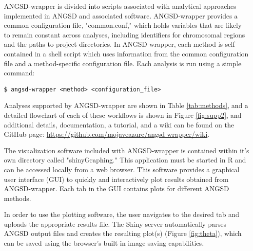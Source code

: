\documentclass[10pt,a4paper]{article}
\begin{document}
ANGSD-wrapper is divided into scripts associated with analytical approaches implemented in ANGSD and associated software. 
ANGSD-wrapper provides a common configuration file, "common.conf," which  holds variables that are likely to remain constant across analyses, including identifiers for chromosomal regions and the paths to project directories.
In ANGSD-wrapper, each method is self-contained in a shell script which uses information from the common configuration file and a method-specific configuration file. 
Each analysis is run using a simple command:

\begin{lstlisting}
$ angsd-wrapper <method> <configuration_file>
\end{lstlisting}

Analyses supported by ANGSD-wrapper are shown in Table \ref{tab:methods}, and a detailed flowchart of each of these workflows is shown in Figure \ref{fig:supp2}, and additional details, documentation, a tutorial, and a wiki can be found on the GitHub page: \url{https://github.com/mojaveazure/angsd-wrapper/wiki}.

The visualization software included with ANGSD-wrapper is contained within it's own directory called "shinyGraphing."
This application must be started in R and can be accessed locally from a web browser. This software provides a graphical user interface (GUI) to quickly and interactively plot results obtained from ANGSD-wrapper.  
Each tab in the GUI contains plots for different ANGSD methods.

In order to use the plotting software, the user navigates to the desired tab and uploads the appropriate results file. 
The Shiny server automatically parses ANGSD output files and creates the resulting plot(s) (Figure \ref{fig:theta}), which can be saved using the browser's built in image saving capabilities.
\end{document}
